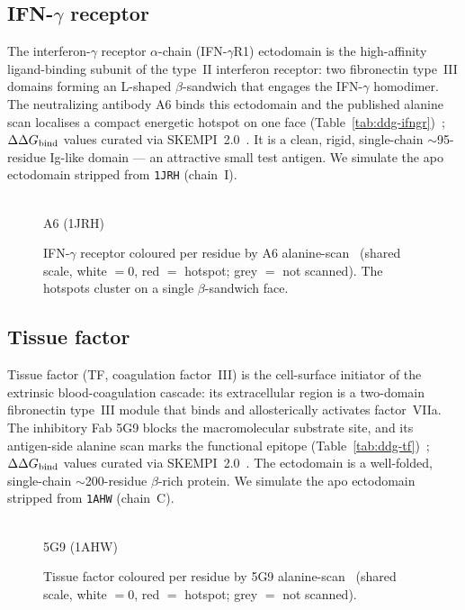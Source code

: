 \subsection{IFN-$\gamma$ receptor}
The interferon-$\gamma$ receptor $\alpha$-chain (IFN-$\gamma$R1) ectodomain is the high-affinity
ligand-binding subunit of the type~II interferon receptor: two fibronectin type~III domains
forming an L-shaped $\beta$-sandwich that engages the IFN-$\gamma$ homodimer. The neutralizing
antibody A6 binds this ectodomain and the published alanine scan localises a compact energetic
hotspot on one face (Table~\ref{tab:ddg-ifngr})~\cite{hofstadter1999}; $\Delta\Delta G_{\mathrm{bind}}$ values curated via
SKEMPI~2.0~\cite{skempi2}. It is a clean, rigid, single-chain
$\sim$95-residue Ig-like domain --- an attractive small test antigen. We simulate the apo
ectodomain stripped from \texttt{1JRH} (chain~I).
\begin{figure}[H]\centering
\begin{minipage}[c]{0.6\linewidth}\centering{}\\[-2pt]{\small A6 (1JRH)}\end{minipage}\hfill
\begin{minipage}[c]{0.13\linewidth}\centering{}\end{minipage}
\caption{IFN-$\gamma$ receptor coloured per residue by A6 alanine-scan \ddG\ (shared scale, white $=0$, red $=$ hotspot; grey $=$ not scanned). The hotspots cluster on a single $\beta$-sandwich face.}\end{figure}


\subsection{Tissue factor}
Tissue factor (TF, coagulation factor~III) is the cell-surface initiator of the extrinsic
blood-coagulation cascade: its extracellular region is a two-domain fibronectin type~III module
that binds and allosterically activates factor~VIIa. The inhibitory Fab 5G9 blocks the
macromolecular substrate site, and its antigen-side alanine scan marks the functional epitope
(Table~\ref{tab:ddg-tf})~\cite{huang1998}; $\Delta\Delta G_{\mathrm{bind}}$ values curated via SKEMPI~2.0~\cite{skempi2}. The ectodomain is a well-folded, single-chain $\sim$200-residue
$\beta$-rich protein. We simulate the apo ectodomain stripped from \texttt{1AHW} (chain~C).
\begin{figure}[H]\centering
\begin{minipage}[c]{0.6\linewidth}\centering{}\\[-2pt]{\small 5G9 (1AHW)}\end{minipage}\hfill
\begin{minipage}[c]{0.13\linewidth}\centering{}\end{minipage}
\caption{Tissue factor coloured per residue by 5G9 alanine-scan \ddG\ (shared scale, white $=0$, red $=$ hotspot; grey $=$ not scanned).}\end{figure}


